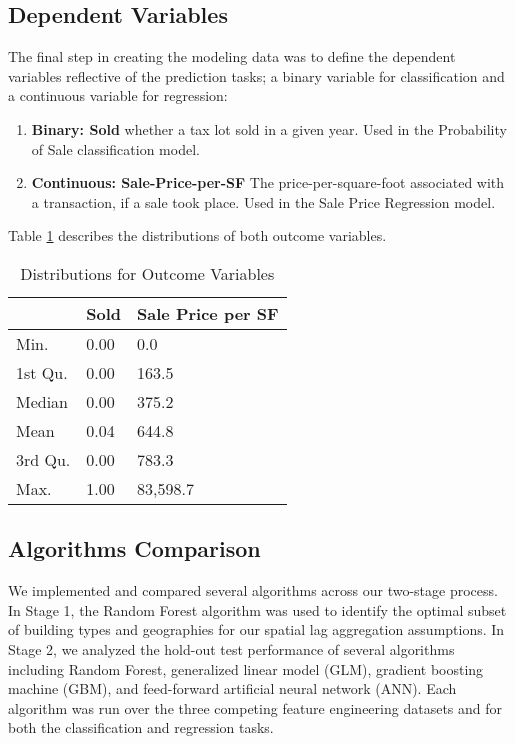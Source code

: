 \documentclass[12pt,]{article}
\providecommand{\tightlist}{%
  \setlength{\itemsep}{0pt}\setlength{\parskip}{0pt}}
\begin{document}
\hypertarget{dependent-variables}{%
\subsection{Dependent Variables}\label{dependent-variables}}

The final step in creating the modeling data was to define the dependent
variables reflective of the prediction tasks; a binary variable for
classification and a continuous variable for regression:

\begin{enumerate}
\def\labelenumi{\arabic{enumi})}
\tightlist
\item
  \textbf{Binary: Sold} whether a tax lot sold in a given year. Used in
  the Probability of Sale classification model.
\item
  \textbf{Continuous: Sale-Price-per-SF} The price-per-square-foot
  associated with a transaction, if a sale took place. Used in the Sale
  Price Regression model.
\end{enumerate}

\noindent Table \ref{tab:OutcomeDistro} describes the distributions of
both outcome variables.

\begin{table}

\caption{\label{tab:table 4}\label{tab:OutcomeDistro} Distributions for Outcome Variables}
\centering
\begin{tabular}[t]{lll}
\toprule
  & Sold & Sale Price per SF\\
\midrule
Min. & 0.00 & 0.0\\
1st Qu. & 0.00 & 163.5\\
Median & 0.00 & 375.2\\
Mean & 0.04 & 644.8\\
3rd Qu. & 0.00 & 783.3\\
Max. & 1.00 & 83,598.7\\
\bottomrule
\end{tabular}
\end{table}

\hypertarget{algorithms-comparison}{%
\subsection{Algorithms Comparison}\label{algorithms-comparison}}

We implemented and compared several algorithms across our two-stage
process. In Stage 1, the Random Forest algorithm was used to identify
the optimal subset of building types and geographies for our spatial lag
aggregation assumptions. In Stage 2, we analyzed the hold-out test
performance of several algorithms including Random Forest, generalized
linear model (GLM), gradient boosting machine (GBM), and feed-forward
artificial neural network (ANN). Each algorithm was run over the three
competing feature engineering datasets and for both the classification
and regression tasks.
\end{document}
